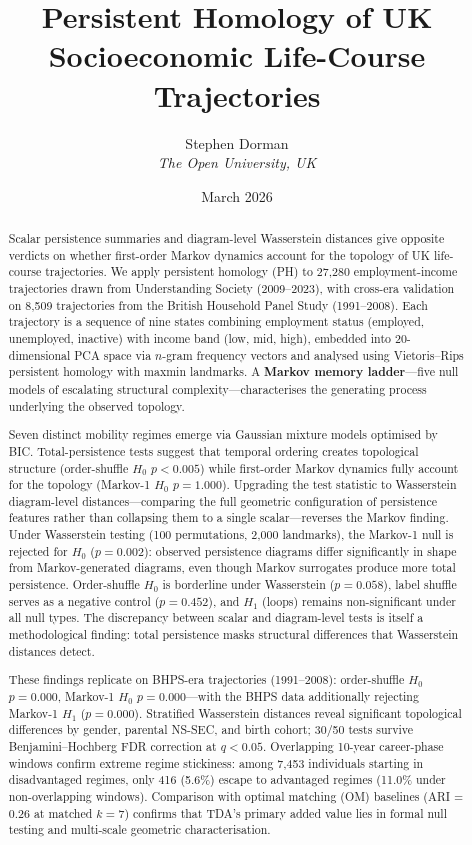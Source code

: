 \documentclass[12pt, a4paper]{article}
\title{Persistent Homology of UK Socioeconomic Life-Course Trajectories}
\author{%
  Stephen Dorman\\
  \textit{The Open University, UK}
}
\date{March 2026}
\newcommand{\HH}[1]{H_{#1}}    %
\newcommand{\pval}{\textit{p}}  %
\begin{document}
\maketitle

\begin{abstract}
Scalar persistence summaries and diagram-level Wasserstein distances give opposite verdicts on whether first-order Markov dynamics account for the topology of UK life-course trajectories.
We apply persistent homology (PH) to 27,280 employment-income trajectories drawn from Understanding Society (2009--2023), with cross-era validation on 8,509 trajectories from the British Household Panel Study (1991--2008).
Each trajectory is a sequence of nine states combining employment status (employed, unemployed, inactive) with income band (low, mid, high), embedded into 20-dimensional PCA space via $n$-gram frequency vectors and analysed using Vietoris--Rips persistent homology with maxmin landmarks.
A \textbf{Markov memory ladder}---five null models of escalating structural complexity---characterises the generating process underlying the observed topology.

Seven distinct mobility regimes emerge via Gaussian mixture models optimised by BIC.
Total-persistence tests suggest that temporal ordering creates topological structure (order-shuffle $\HH{0}$ $\pval < 0.005$) while first-order Markov dynamics fully account for the topology (Markov-1 $\HH{0}$ $\pval = 1.000$).
Upgrading the test statistic to Wasserstein diagram-level distances---comparing the full geometric configuration of persistence features rather than collapsing them to a single scalar---reverses the Markov finding.
Under Wasserstein testing (100 permutations, 2,000 landmarks), the Markov-1 null is rejected for $\HH{0}$ ($\pval = 0.002$): observed persistence diagrams differ significantly in shape from Markov-generated diagrams, even though Markov surrogates produce more total persistence.
Order-shuffle $\HH{0}$ is borderline under Wasserstein ($\pval = 0.058$), label shuffle serves as a negative control ($\pval = 0.452$), and $\HH{1}$ (loops) remains non-significant under all null types.
The discrepancy between scalar and diagram-level tests is itself a methodological finding: total persistence masks structural differences that Wasserstein distances detect.

These findings replicate on BHPS-era trajectories (1991--2008): order-shuffle $\HH{0}$ $\pval = 0.000$, Markov-1 $\HH{0}$ $\pval = 0.000$---with the BHPS data additionally rejecting Markov-1 $\HH{1}$ ($\pval = 0.000$).
Stratified Wasserstein distances reveal significant topological differences by gender, parental NS-SEC, and birth cohort; 30/50 tests survive Benjamini--Hochberg FDR correction at $q < 0.05$.
Overlapping 10-year career-phase windows confirm extreme regime stickiness: among 7,453 individuals starting in disadvantaged regimes, only 416 (5.6\%) escape to advantaged regimes (11.0\% under non-overlapping windows).
Comparison with optimal matching (OM) baselines (ARI = 0.26 at matched $k = 7$) confirms that TDA's primary added value lies in formal null testing and multi-scale geometric characterisation.


\end{abstract}
\end{document}
